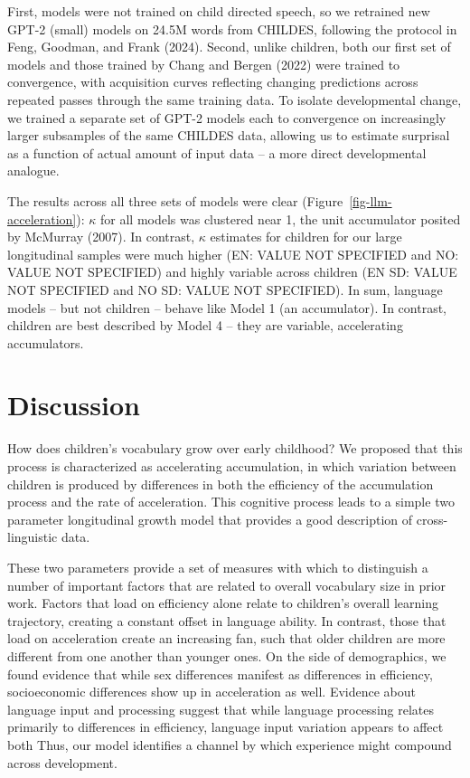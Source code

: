 \documentclass[
  11pt,
]{article}
\begin{document}
First, models were not trained on child directed speech, so we retrained
new GPT-2 (small) models on 24.5M words from CHILDES, following the
protocol in Feng, Goodman, and Frank (2024). Second, unlike children,
both our first set of models and those trained by Chang and Bergen
(2022) were trained to convergence, with acquisition curves reflecting
changing predictions across repeated passes through the same training
data. To isolate developmental change, we trained a separate set of
GPT-2 models each to convergence on increasingly larger subsamples of
the same CHILDES data, allowing us to estimate surprisal as a function
of actual amount of input data -- a more direct developmental analogue.

The results across all three sets of models were clear
(Figure~\ref{fig-llm-acceleration}): \(\kappa\) for all models was
clustered near 1, the unit accumulator posited by McMurray (2007). In
contrast, \(\kappa\) estimates for children for our large longitudinal
samples were much higher (EN: VALUE NOT SPECIFIED and NO: VALUE NOT
SPECIFIED) and highly variable across children (EN SD: VALUE NOT
SPECIFIED and NO SD: VALUE NOT SPECIFIED). In sum, language models --
but not children -- behave like Model 1 (an accumulator). In contrast,
children are best described by Model 4 -- they are variable,
accelerating accumulators.

\section{Discussion}\label{discussion}

How does children's vocabulary grow over early childhood? We proposed
that this process is characterized as accelerating accumulation, in
which variation between children is produced by differences in both the
efficiency of the accumulation process and the rate of acceleration.
This cognitive process leads to a simple two parameter longitudinal
growth model that provides a good description of cross-linguistic data.

These two parameters provide a set of measures with which to distinguish
a number of important factors that are related to overall vocabulary
size in prior work. Factors that load on efficiency alone relate to
children's overall learning trajectory, creating a constant offset in
language ability. In contrast, those that load on acceleration create an
increasing fan, such that older children are more different from one
another than younger ones. On the side of demographics, we found
evidence that while sex differences manifest as differences in
efficiency, socioeconomic differences show up in acceleration as well.
Evidence about language input and processing suggest that while language
processing relates primarily to differences in efficiency, language
input variation appears to affect both Thus, our model identifies a
channel by which experience might compound across development.
\end{document}
